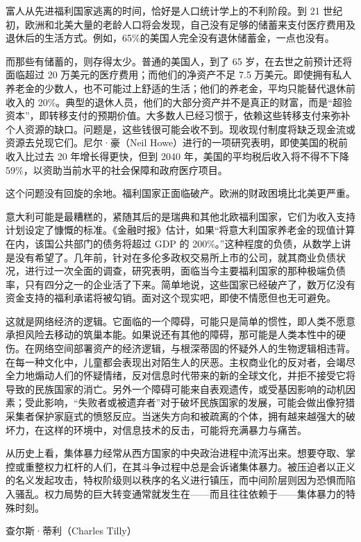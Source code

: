 富人从先进福利国家逃离的时间，恰好是人口统计学上的不利阶段。到 21 世纪初，欧洲和北美大量的老龄人口将会发现，自己没有足够的储蓄来支付医疗费用及退休后的生活方式。例如，65\%的美国人完全没有退休储蓄金，一点也没有。

而那些有储蓄的，则存得太少。普通的美国人，到了 65 岁，在去世之前预计还将面临超过 20 万美元的医疗费用；而他们的净资产不足 7.5 万美元。即使拥有私人养老金的少数人，也不可能过上舒适的生活；他们的养老金，平均只能替代退休前收入的 20\%。典型的退休人员，他们的大部分资产并不是真正的财富，而是“超验资本”，即转移支付的预期价值。大多数人已经习惯于，依赖这些转移支付来弥补个人资源的缺口。问题是，这些钱很可能会收不到。现收现付制度将缺乏现金流或资源去兑现它们。尼尔·豪（Neil Howe）进行的一项研究表明，即使美国的税前收入比过去 20 年增长得更快，但到 2040 年，美国的平均税后收入将不得不下降 59\%，以资助当前水平的社会保障和政府医疗项目。

这个问题没有回旋的余地。福利国家正面临破产。欧洲的财政困境比北美更严重。

意大利可能是最糟糕的，紧随其后的是瑞典和其他北欧福利国家，它们为收入支持计划设定了慷慨的标准。《金融时报》估计，如果“将意大利国家养老金的现值计算在内，该国公共部门的债务将超过 GDP 的 200\%。”这种程度的负债，从数学上讲是没有希望了。几年前，针对在多伦多政权交易所上市的公司，就其商业负债状况，进行过一次全面的调查，研究表明，面临当今主要福利国家的那种极端负债率，只有四分之一的企业活了下来。简单地说，这些国家已经破产了，数万亿没有资金支持的福利承诺将被勾销。面对这个现实吧，即使不情愿但也无可避免。

这就是网络经济的逻辑。它面临的一个障碍，可能只是简单的惯性，即人类不愿意承担风险去移动的筑巢本能。如果说还有其他的障碍，那可能是人类本性中的硬伤。在网络空间部署资产的经济逻辑，与根深蒂固的怀疑外人的生物逻辑相违背。在每一种文化中，儿童都会表现出对陌生人的厌恶。主权商业化的反对者，会竭尽全力地煽动人们的怀疑情绪，反对信息时代带来的新的全球文化，并拒不接受它将导致的民族国家的消亡。另外一个障碍可能来自表观遗传，或受基因影响的动机因素；受此影响，“失败者或被遗弃者”对于破坏民族国家的发展，可能会做出像狩猎采集者保护家庭式的愤怒反应。当迷失方向和被疏离的个体，拥有越来越强大的破坏力，在这样的环境中，对信息技术的反击，可能将充满暴力与痛苦。

\begin{tcolorbox}
从历史上看，集体暴力经常从西方国家的中央政治进程中流泻出来。想要夺取、掌控或重整权力杠杆的人们，在其斗争过程中总是会诉诸集体暴力。被压迫者以正义的名义发起攻击，特权阶级则以秩序的名义进行镇压，而中间阶层则因为恐惧而陷入骚乱。权力局势的巨大转变通常就发生在——而且往往依赖于——集体暴力的特殊时刻。
\begin{flushright}
查尔斯·蒂利（Charles Tilly）
\end{flushright}
\end{tcolorbox}


